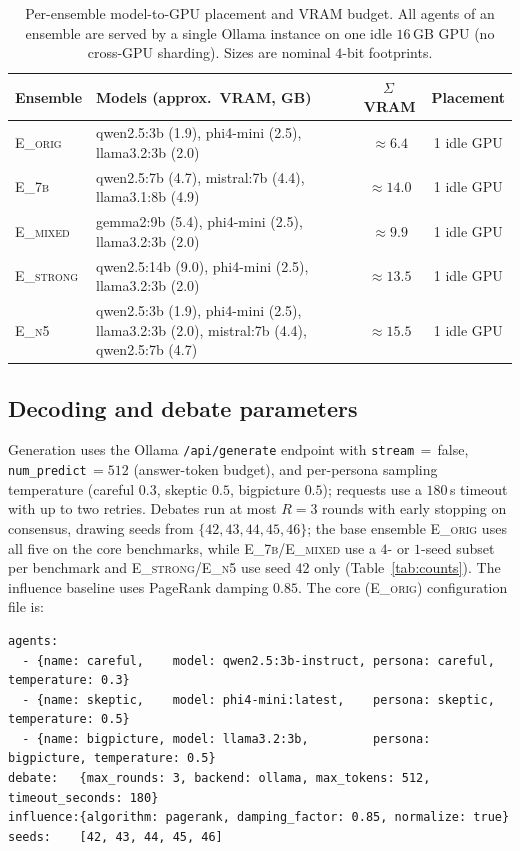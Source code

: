 \begin{table}[h]
\centering\small
\caption{Per-ensemble model-to-GPU placement and VRAM budget. All agents of an ensemble are served by a
single Ollama instance on one idle $16$\,GB GPU (no cross-GPU sharding). Sizes are nominal $4$-bit footprints.}
\label{tab:serving}
\begin{tabular}{l p{6.4cm} c c}
\toprule
Ensemble & Models (approx.\ VRAM, GB) & $\Sigma$\,VRAM & Placement \\
\midrule
\textsc{E\_orig}   & qwen2.5:3b (1.9), phi4-mini (2.5), llama3.2:3b (2.0)                       & $\approx6.4$  & 1 idle GPU \\
\textsc{E\_7b}     & qwen2.5:7b (4.7), mistral:7b (4.4), llama3.1:8b (4.9)                      & $\approx14.0$ & 1 idle GPU \\
\textsc{E\_mixed}  & gemma2:9b (5.4), phi4-mini (2.5), llama3.2:3b (2.0)                        & $\approx9.9$  & 1 idle GPU \\
\textsc{E\_strong} & qwen2.5:14b (9.0), phi4-mini (2.5), llama3.2:3b (2.0)                      & $\approx13.5$ & 1 idle GPU \\
\textsc{E\_n5}     & qwen2.5:3b (1.9), phi4-mini (2.5), llama3.2:3b (2.0), mistral:7b (4.4), qwen2.5:7b (4.7) & $\approx15.5$ & 1 idle GPU \\
\bottomrule
\end{tabular}
\end{table}

\subsection{Decoding and debate parameters}
Generation uses the Ollama \texttt{/api/generate} endpoint with \texttt{stream}\,$=$\,false,
\texttt{num\_predict}\,$=512$ (answer-token budget), and per-persona sampling temperature (careful $0.3$,
skeptic $0.5$, bigpicture $0.5$); requests use a $180$\,s timeout with up to two retries. Debates run at
most $R=3$ rounds with early stopping on consensus, drawing seeds from $\{42,43,44,45,46\}$; the base
ensemble \textsc{E\_orig} uses all five on the core benchmarks, while \textsc{E\_7b}/\textsc{E\_mixed} use a
$4$- or $1$-seed subset per benchmark and \textsc{E\_strong}/\textsc{E\_n5} use seed $42$ only
(Table~\ref{tab:counts}). The influence baseline uses PageRank damping $0.85$. The core (\textsc{E\_orig})
configuration file is:
\begin{verbatim}
agents:
  - {name: careful,    model: qwen2.5:3b-instruct, persona: careful,    temperature: 0.3}
  - {name: skeptic,    model: phi4-mini:latest,    persona: skeptic,    temperature: 0.5}
  - {name: bigpicture, model: llama3.2:3b,         persona: bigpicture, temperature: 0.5}
debate:   {max_rounds: 3, backend: ollama, max_tokens: 512, timeout_seconds: 180}
influence:{algorithm: pagerank, damping_factor: 0.85, normalize: true}
seeds:    [42, 43, 44, 45, 46]
\end{verbatim}

